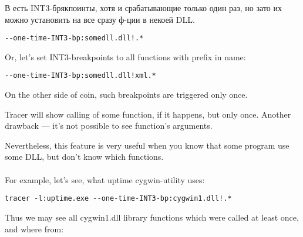 В \tracer есть INT3-брякпоинты, хотя и срабатывающие только один раз, но зато их можно установить на все
сразу ф-ции в некоей DLL.

\begin{lstlisting}
--one-time-INT3-bp:somedll.dll!.*
\end{lstlisting}

{Or, let's set INT3-breakpoints to all functions with  prefix in name:}

\begin{lstlisting}
--one-time-INT3-bp:somedll.dll!xml.*
\end{lstlisting}

{On the other side of coin, such breakpoints are triggered only once.}

Tracer 
{will show calling of some function, if it happens, but only once.}
{Another drawback --- it's not possible to see function's arguments.}

{Nevertheless, this feature is very useful when you know that some program use some DLL, but don't know which functions.}
 \\
\\
{For example, let's see, what uptime cygwin-utility uses}:

\begin{lstlisting}
tracer -l:uptime.exe --one-time-INT3-bp:cygwin1.dll!.*
\end{lstlisting}

{Thus we may see all cygwin1.dll library functions which were called at least once, and where from}:



